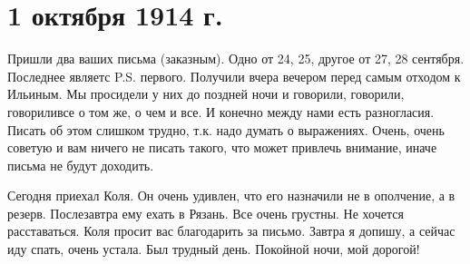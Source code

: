 \section{1 октября 1914 г.}


Пришли два ваших письма (заказным). Одно от 24, 25, другое от 27, 28 сентября.
Последнее являетс P.S. первого. Получили вчера вечером перед самым отходом к
Ильиным. Мы просидели у них до поздней ночи и говорили, говорили,
говорили\textellipsis все о том же, о чем и все. И конечно между нами есть
разногласия. Писать об этом слишком трудно, т.к. надо думать о выражениях.
Очень, очень советую и вам ничего не писать такого, что может привлечь
внимание, иначе письма не будут доходить.

Сегодня приехал Коля. Он очень удивлен, что его назначили не в ополчение, а в
резерв. Послезавтра ему ехать в Рязань. Все очень грустны. Не хочется
расставаться. Коля просит вас благодарить за письмо. Завтра я допишу, а сейчас
иду спать, очень устала. Был трудный день. Покойной ночи, мой дорогой!
